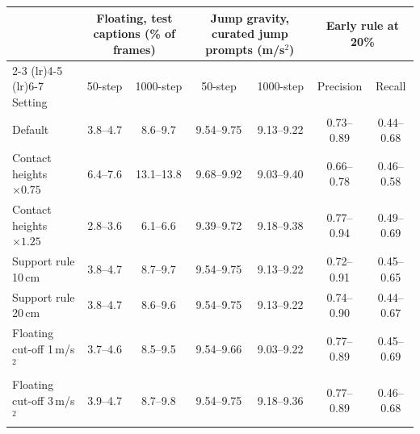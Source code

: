 \begin{tabular}{lcccccc}
\toprule
& \multicolumn{2}{c}{Floating, test captions (\% of frames)} & \multicolumn{2}{c}{Jump gravity, curated jump prompts (m/s$^2$)} & \multicolumn{2}{c}{Early rule at 20\%} \\
\cmidrule(lr){2-3} \cmidrule(lr){4-5} \cmidrule(lr){6-7}
Setting & 50-step & 1000-step & 50-step & 1000-step & Precision & Recall \\
\midrule
Default & 3.8--4.7 & 8.6--9.7 & 9.54--9.75 & 9.13--9.22 & 0.73--0.89 & 0.44--0.68 \\
Contact heights $\times 0.75$ & 6.4--7.6 & 13.1--13.8 & 9.68--9.92 & 9.03--9.40 & 0.66--0.78 & 0.46--0.58 \\
Contact heights $\times 1.25$ & 2.8--3.6 & 6.1--6.6 & 9.39--9.72 & 9.18--9.38 & 0.77--0.94 & 0.49--0.69 \\
Support rule 10\,cm & 3.8--4.7 & 8.7--9.7 & 9.54--9.75 & 9.13--9.22 & 0.72--0.91 & 0.45--0.65 \\
Support rule 20\,cm & 3.8--4.7 & 8.6--9.6 & 9.54--9.75 & 9.13--9.22 & 0.74--0.90 & 0.44--0.67 \\
Floating cut-off 1\,m/s$^2$ & 3.7--4.6 & 8.5--9.5 & 9.54--9.66 & 9.03--9.22 & 0.77--0.89 & 0.45--0.69 \\
Floating cut-off 3\,m/s$^2$ & 3.9--4.7 & 8.7--9.8 & 9.54--9.75 & 9.18--9.36 & 0.77--0.89 & 0.46--0.68 \\
\bottomrule
\end{tabular}

